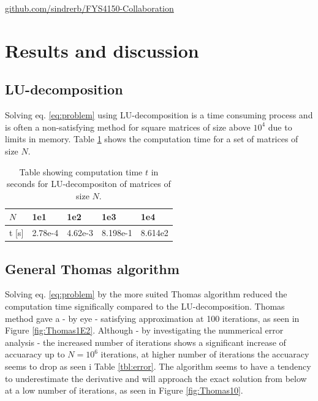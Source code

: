 \documentclass[twoside,twocolumn]{article}
\begin{document}
\begin{center}
 \href{https://github.com/sindrerb/FYS4150-Collaboration}{github.com/sindrerb/FYS4150-Collaboration}
\end{center}

\newpage
\section{Results and discussion}
\subsection{LU-decomposition}
Solving eq. \ref{eq:problem} using LU-decomposition is a time consuming process and is often a non-satisfying method for square matrices of size above $10^4$ due to limits in memory. Table \ref{tbl:time_LU} shows the computation time for a set of matrices of size $N$.
\begin{table}[h]
\begin{tabular}{|l|l|l|l|l|} \hline
$N$ & 1e1 & 1e2 & 1e3 & 1e4\\ \hline
t [s] & 2.78e-4 &4.62e-3 & 8.198e-1 & 8.614e2\\ \hline
\end{tabular}
\caption{Table showing computation time $t$ in seconds for LU-decompositon of matrices of size $N$.} \label{tbl:time_LU}
\end{table}
\subsection{General Thomas algorithm}
Solving eq. \ref{eq:problem} by the more suited Thomas algorithm reduced the computation time significally compared to the LU-decomposition. Thomas method gave a - by eye - satisfying approximation at 100 iterations, as seen in Figure \ref{fig:Thomas1E2}. Although - by investigating the nummerical error analysis - the increased number of iterations shows a significant increase of accuaracy up to $N=10^6$ iterations, at higher number of iterations the accuaracy seems to drop as seen i Table \ref{tbl:error}.
The algorithm seems to have a tendency to underestimate the derivative and will approach the exact solution from below at a low number of iterations, as seen in Figure \ref{fig:Thomas10}.
\end{document}
